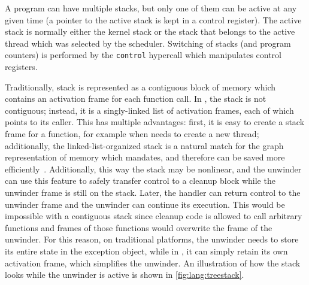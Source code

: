 A \divm{} program can have multiple stacks, but only one of them can be
active at any given time (a pointer to the active stack is kept in a
\divm{} control register). The active stack is normally either the kernel
stack or the stack that belongs to the active thread which was selected
by the scheduler. Switching of stacks (and program counters) is
performed by the \texttt{control} hypercall which manipulates \divm{}
control registers.

Traditionally, stack is represented as a contiguous block of memory
which contains an activation frame for each function call. In \divm{}, the
stack is not contiguous; instead, it is a singly-linked list of
activation frames, each of which points to its caller. This has multiple
advantages: first, it is easy to create a stack frame for a function,
for example when \dios{} needs to create a new thread; additionally, the
linked-list-organized stack is a natural match for the graph
representation of memory which \divm{} mandates, and therefore can be saved
more efficiently~. Additionally, this way the stack
may be nonlinear, and the unwinder can use this feature to safely
transfer control to a cleanup block while the unwinder frame is still on
the stack. Later, the handler can return control to the unwinder frame
and the unwinder can continue its execution. This would be impossible
with a contiguous stack since cleanup code is allowed to call arbitrary
functions and frames of those functions would overwrite the frame of the
unwinder. For this reason, on traditional platforms, the unwinder needs
to store its entire state in the exception object, while in \divm{}, it can
simply retain its own activation frame, which simplifies the unwinder.
An illustration of how the stack looks while the unwinder is active is shown in
\autoref{fig:lang:treestack}.

